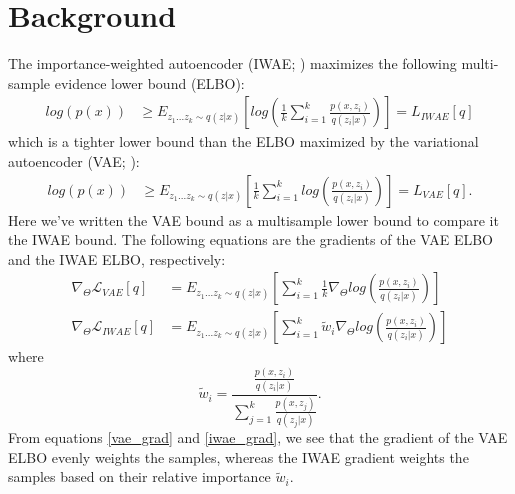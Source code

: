 \documentclass{article} %
\newcommand{\eqname}[1]{\tag*{#1}}
\begin{document}
\section{Background}
The importance-weighted autoencoder (IWAE; \cite{burda2015importance}) maximizes the following multi-sample evidence lower bound (ELBO): 
\begin{align} 
    log(p(x)) &
    \geq E_{z_{1}...z_{k} \sim q(z|x)} \left[log\left(  \frac{1}{k}  \sum_{i=1}^k \frac{p(x,z_i)}{q(z_i|x)}  \right)  \right] = L_{IWAE}[q] \label{iwae_elbo}  \eqname{(IWAE ELBO)}
\end{align}
which is a tighter lower bound than the ELBO maximized by the variational autoencoder (VAE; \cite{vae}):
\begin{align}
    log(p(x)) & \geq E_{z_{1}...z_{k} \sim q(z|x)} \left[  \frac{1}{k}\sum_{i=1}^k log\left(\frac{p(x,z_i)}{q(z_i|x)}  \right)  \right] = L_{VAE}[q]. \label{vae_elbo} \eqname{(VAE ELBO)}
\end{align}
Here we've written the VAE bound as a multisample lower bound to compare it the IWAE bound. The following equations are the gradients of the VAE ELBO and the IWAE ELBO, respectively:
\begin{align} 
    \nabla_{\Theta} \mathcal{L}_{VAE}[q] &= E_{z_{1}...z_{k} \sim q(z|x)} \left[   \sum_{i=1}^k \frac{1}{k} \nabla_{\Theta} log\left(\frac{p(x,z_i)}{q(z_i|x)}  \right)  \right] \label{vae_grad} \\
    \nabla_{\Theta} \mathcal{L}_{IWAE}[q] &= E_{z_{1}...z_{k} \sim q(z|x)} \left[  \sum_{i=1}^k \tilde{w}_i \nabla_{\Theta} log\left(\frac{p(x,z_i)}{q(z_i|x)}  \right)  \right] \label{iwae_grad}
\end{align}
where $$\tilde{w}_i = \frac{\frac{p(x,z_i)}{q(z_i|x)}}{\sum_{j=1}^k \frac{p(x,z_j)}{q(z_j|x)}}.$$
From equations \ref{vae_grad} and \ref{iwae_grad}, we see that the gradient of the VAE ELBO evenly weights the samples, whereas the IWAE gradient weights the samples based on their relative importance $\tilde{w}_i$.




\end{document}
